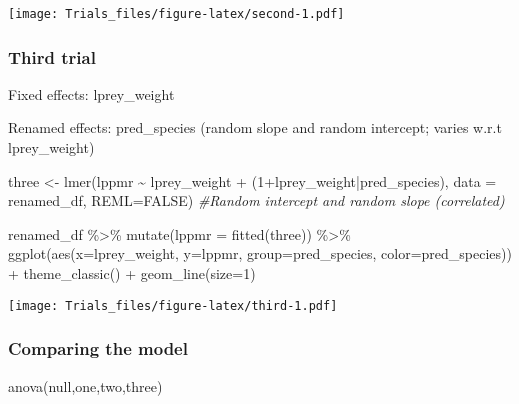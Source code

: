 \documentclass[
]{article}
\newenvironment{Shaded}{\begin{snugshade}}{\end{snugshade}}
\newcommand{\AttributeTok}[1]{\textcolor[rgb]{0.77,0.63,0.00}{#1}}
\newcommand{\CommentTok}[1]{\textcolor[rgb]{0.56,0.35,0.01}{\textit{#1}}}
\newcommand{\ConstantTok}[1]{\textcolor[rgb]{0.00,0.00,0.00}{#1}}
\newcommand{\DecValTok}[1]{\textcolor[rgb]{0.00,0.00,0.81}{#1}}
\newcommand{\FunctionTok}[1]{\textcolor[rgb]{0.00,0.00,0.00}{#1}}
\newcommand{\NormalTok}[1]{#1}
\newcommand{\OtherTok}[1]{\textcolor[rgb]{0.56,0.35,0.01}{#1}}
\newcommand{\SpecialCharTok}[1]{\textcolor[rgb]{0.00,0.00,0.00}{#1}}
\begin{document}
\texttt{[image: Trials\_files/figure-latex/second-1.pdf]}

\hypertarget{third-trial}{%
\subsubsection{Third trial}\label{third-trial}}

Fixed effects: lprey\_weight

Renamed effects: pred\_species (random slope and random intercept;
varies w.r.t lprey\_weight)

\begin{Shaded}
\begin{Highlighting}[]
\NormalTok{three }\OtherTok{\textless{}{-}} \FunctionTok{lmer}\NormalTok{(lppmr }\SpecialCharTok{\textasciitilde{}}\NormalTok{ lprey\_weight }\SpecialCharTok{+}\NormalTok{ (}\DecValTok{1}\SpecialCharTok{+}\NormalTok{lprey\_weight}\SpecialCharTok{|}\NormalTok{pred\_species), }\AttributeTok{data =}\NormalTok{ renamed\_df, }\AttributeTok{REML=}\ConstantTok{FALSE}\NormalTok{)}
\CommentTok{\#Random intercept and random slope (correlated)}

\NormalTok{renamed\_df }\SpecialCharTok{\%\textgreater{}\%} 
    \FunctionTok{mutate}\NormalTok{(}\AttributeTok{lppmr =} \FunctionTok{fitted}\NormalTok{(three)) }\SpecialCharTok{\%\textgreater{}\%} 
    \FunctionTok{ggplot}\NormalTok{(}\FunctionTok{aes}\NormalTok{(}\AttributeTok{x=}\NormalTok{lprey\_weight, }\AttributeTok{y=}\NormalTok{lppmr, }\AttributeTok{group=}\NormalTok{pred\_species, }\AttributeTok{color=}\NormalTok{pred\_species)) }\SpecialCharTok{+} 
    \FunctionTok{theme\_classic}\NormalTok{() }\SpecialCharTok{+}
    \FunctionTok{geom\_line}\NormalTok{(}\AttributeTok{size=}\DecValTok{1}\NormalTok{) }
\end{Highlighting}
\end{Shaded}

\texttt{[image: Trials\_files/figure-latex/third-1.pdf]}

\hypertarget{comparing-the-model}{%
\subsubsection{Comparing the model}\label{comparing-the-model}}

\begin{Shaded}
\begin{Highlighting}[]
\FunctionTok{anova}\NormalTok{(null,one,two,three)}
\end{Highlighting}
\end{Shaded}
\end{document}
